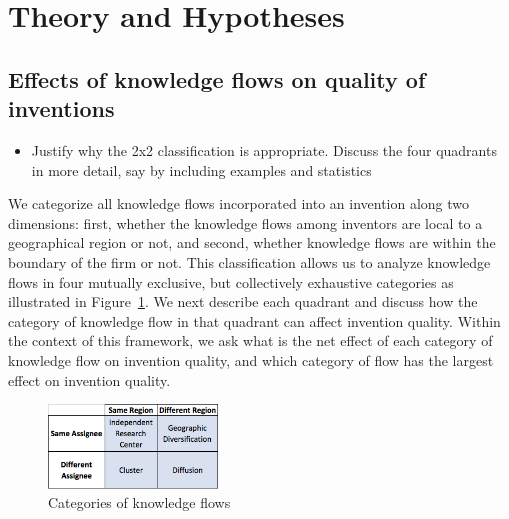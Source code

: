 \documentclass[12pt,letterpaper]{article}
\begin{document}
\section*{Theory and Hypotheses}
\subsection*{Effects of knowledge flows on quality of inventions}
\begin{itemize}
\item Justify why the 2x2 classification is appropriate. Discuss the four quadrants in more detail, say by including examples and statistics
\end{itemize}

We categorize all knowledge flows incorporated into an invention along two dimensions:  first, whether the knowledge flows among inventors are local to a geographical region or not, and second, whether knowledge flows are within the boundary of the firm or not. This classification allows us to analyze knowledge flows in four mutually exclusive, but collectively exhaustive categories as illustrated in Figure~\ref{fig:2x2}. We next describe each quadrant and discuss how the category of knowledge flow in that quadrant can affect invention quality. Within the context of this framework, we ask what is the net effect of each category of knowledge flow on invention quality, and which category of flow has the largest effect on invention quality. \par
\begin{figure}[h!]
\begin{centering}
  \includegraphics[width=0.4\textwidth]{2x2}
  \caption{Categories of knowledge flows}
  \label{fig:2x2}
\end{centering}
\end{figure}
\end{document}
